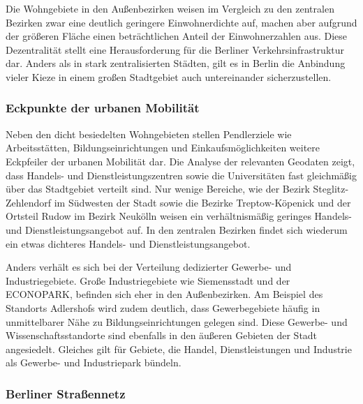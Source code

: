 
Die Wohngebiete in den Außenbezirken weisen im Vergleich zu den zentralen Bezirken zwar eine deutlich geringere Einwohnerdichte auf, machen aber aufgrund der größeren Fläche einen beträchtlichen Anteil der Einwohnerzahlen aus. Diese Dezentralität stellt eine Herausforderung für die Berliner Verkehrsinfrastruktur dar. Anders als in stark zentralisierten Städten, gilt es in Berlin die Anbindung vieler Kieze in einem großen Stadtgebiet auch untereinander sicherzustellen.

\subsubsection{Eckpunkte der urbanen Mobilität}

Neben den dicht besiedelten Wohngebieten stellen Pendlerziele wie Arbeitsstätten, Bildungseinrichtungen und Einkaufsmöglichkeiten weitere Eckpfeiler der urbanen Mobilität dar. Die Analyse der relevanten Geodaten zeigt, dass Handels- und Dienstleistungszentren sowie die Universitäten fast gleichmäßig über das Stadtgebiet verteilt sind. Nur wenige Bereiche, wie der Bezirk Steglitz-Zehlendorf im Südwesten der Stadt sowie die Bezirke Treptow-Köpenick und der Ortsteil Rudow im Bezirk Neukölln weisen ein verhältnismäßig geringes Handels- und Dienstleistungsangebot auf. In den zentralen Bezirken findet sich wiederum ein etwas dichteres Handels- und Dienstleistungsangebot.

Anders verhält es sich bei der Verteilung dedizierter Gewerbe- und Industriegebiete. Große Industriegebiete wie Siemensstadt und der ECONOPARK, befinden sich eher in den Außenbezirken. Am Beispiel des Standorts Adlershofs wird zudem deutlich, dass Gewerbegebiete häufig in unmittelbarer Nähe zu Bildungseinrichtungen gelegen sind. Diese Gewerbe- und Wissenschaftsstandorte sind ebenfalls in den äußeren Gebieten der Stadt angesiedelt. Gleiches gilt für Gebiete, die Handel, Dienstleistungen und Industrie als Gewerbe- und Industriepark bündeln.


\subsubsection{Berliner Straßennetz}

